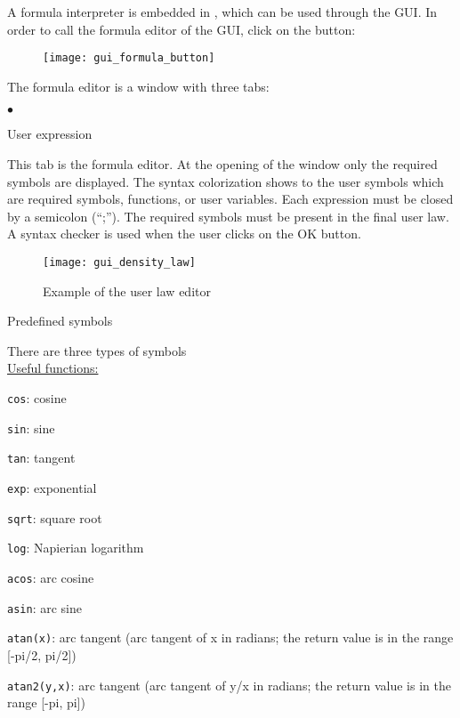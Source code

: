 {{{A formula interpreter is embedded in \CS, which can be used through the GUI.
In order to call the formula editor of the GUI, click on the button:

\begin{figure}[!ht]
\begin{center}
\texttt{[image: gui\_formula\_button]}
\label{fig:mei_button}
\end{center}
\end{figure}

The formula editor is a window with three tabs:
\begin{list}{$\bullet$}{}
\item User expression

This tab is the formula editor. At the opening of the
window only the required symbols are displayed.
The syntax colorization shows to the user symbols which are
required symbols, functions, or user variables.
Each expression must be closed by a semicolon (``;''). The
required symbols must be present in the final user law. A
syntax checker is used when the user clicks on the OK button.

\begin{figure}[!ht]
\begin{center}
\texttt{[image: gui\_density\_law]}
\caption{Example of the user law editor}
\label{fig:mei_editor}
\end{center}
\end{figure}

\item Predefined symbols

There are three types of symbols \\

\underline{Useful functions:}

\texttt{cos}: cosine

\texttt{sin}: sine

\texttt{tan}: tangent

\texttt{exp}: exponential

\texttt{sqrt}: square root

\texttt{log}: Napierian logarithm

\texttt{acos}: arc cosine

\texttt{asin}: arc sine

\texttt{atan(x)}: arc tangent (arc tangent of x in radians; the return value is in the range [-pi/2, pi/2])

\texttt{atan2(y,x)}: arc tangent (arc tangent of y/x in radians; the return value is in the range [-pi, pi])


\end{list}}}}
